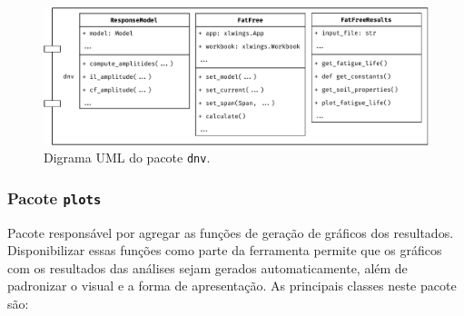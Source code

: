 \begin{figure}[!ht]
    \centering
    \caption{Digrama UML do pacote \texttt{dnv}.}\label{fig:dnv-uml}
    \includegraphics[width=\textwidth]{imagens/dnv-uml}
\end{figure}


\subsubsection{Pacote \texttt{plots}}


Pacote responsável por agregar as funções de geração de gráficos dos resultados. Disponibilizar essas funções como parte da ferramenta permite que os gráficos com os resultados das análises sejam gerados automaticamente, além de padronizar o visual e a forma de apresentação. As principais classes neste pacote são:

